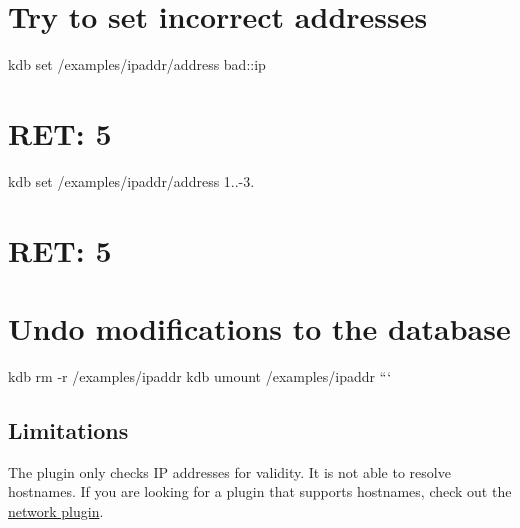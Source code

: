 \section*{Try to set incorrect addresses}

kdb set /examples/ipaddr/address bad\+::ip \section*{R\+ET\+: 5}

kdb set /examples/ipaddr/address 1..-\/3. \section*{R\+ET\+: 5}

\section*{Undo modifications to the database}

kdb rm -\/r /examples/ipaddr kdb umount /examples/ipaddr ```

\subsection*{Limitations}

The plugin only checks IP addresses for validity. It is not able to resolve hostnames. If you are looking for a plugin that supports hostnames, check out the \hyperlink{md_src_plugins_network_README_src_plugins_network_README_md}{network plugin}. 